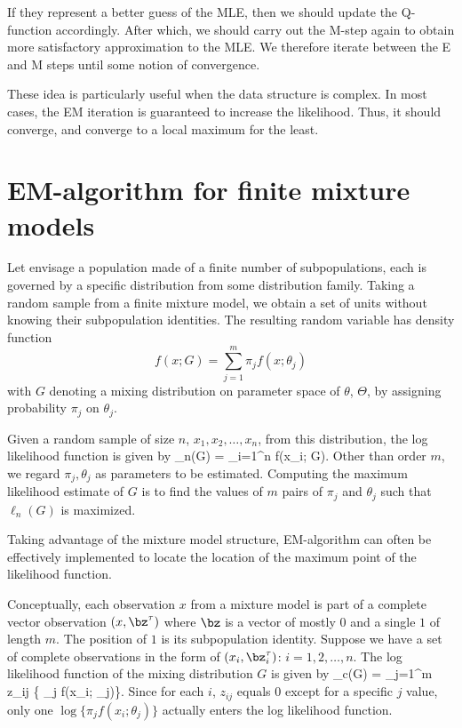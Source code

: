 If they represent a better guess of the MLE,
then we should update the Q-function accordingly.
After which, we should carry out the M-step again
to obtain more satisfactory approximation to the MLE.
We therefore iterate between the E and M steps until some
notion of convergence.

These idea is particularly useful when the data structure
is complex.
In most cases, the EM iteration is guaranteed to increase
the likelihood. Thus, it should converge, and converge
to a local maximum for the least.


\section{EM-algorithm for finite mixture models}
Let envisage a population made of a finite number of subpopulations, 
each is governed by a specific distribution from some distribution family.
Taking a random sample from a finite mixture model, we obtain
a set of units without knowing their subpopulation identities.
The resulting random variable has density function
\[
f(x; G)  = \sum_{j=1}^m \pi_j f(x; \theta_j)
\]
with $G$ denoting a mixing distribution on parameter space
of $\theta$, $\Theta$, by assigning probability $\pi_j$ on $\theta_j$.

Given a random sample of size $n$, $x_1, x_2, \ldots, x_n$,
from this distribution, the log likelihood function is given by
\be
\label{EM.eq0}
\ell_n(G) = \sum_{i=1}^n \log f(x_i; G).
\ee
Other than order $m$, we regard $\pi_j, \theta_j$ as parameters
to be estimated.
Computing the maximum likelihood estimate of $G$ is 
to find the values of $m$ pairs of $\pi_j$ and $\theta_j$
such that $\ell_n(G)$ is maximized.

Taking advantage of the mixture model structure, EM-algorithm can often
be effectively implemented to locate the location of the maximum
point of the likelihood function.

Conceptually, each observation $x$ from a mixture model is part
of a complete vector observation $(x, \bz^\tau)$ where $\bz$ 
is a vector of mostly $0$
and a single $1$ of length $m$. The position of $1$ is its subpopulation identity.
Suppose we have a set of complete observations in the form of
$(x_i, \bz^\tau_i)$: $i=1, 2, \ldots, n$. The log likelihood function
of the mixing distribution $G$ is given by
\be
\label{EM.eq1}
\ell_c(G) 
= 
\sumin \sum_{j=1}^m z_{ij} \log \{ \pi_j f(x_{i}; \theta_j)\}.
\ee
Since for each $i$, $z_{ij}$ equals 0 except for a specific $j$ value,
only one $\log \{ \pi_j f(x_{i}; \theta_j)\}$ actually enters
the log likelihood function.


